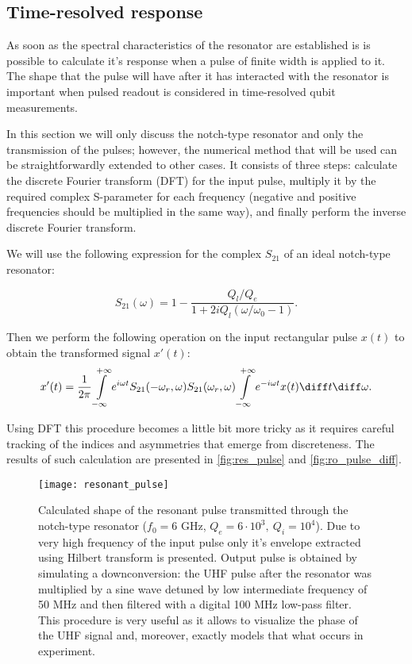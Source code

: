 \subsection{Time-resolved response}

As soon as the spectral characteristics of the resonator are established is is possible to calculate it's response when a pulse of finite width is applied to it. The shape that the pulse will have after it has interacted with the resonator is important when pulsed readout is considered in time-resolved qubit measurements. 

In this section we will only discuss the notch-type resonator and only the transmission of the pulses; however, the numerical method that will be used can be straightforwardly extended to other cases. It consists of three steps: calculate the discrete Fourier transform (DFT) for the input pulse, multiply it by the required complex S-parameter for each frequency (negative and positive frequencies should be multiplied in the same way), and finally perform the inverse discrete Fourier transform. 

We will use the following expression for the complex $S_{21}$ of an ideal notch-type resonator\cite{probst2015}:

\[
S_{21} (\omega)= 1 - \frac{Q_l/Q_e}{1 + 2 i Q_l (\omega/\omega_0 - 1)}.
\]

Then we perform the following operation on the input rectangular pulse $x(t)$ to obtain the transformed signal $x'(t)$:
\[
x'(t) = \frac{1}{2\pi}\int\limits_{-\infty}^{+\infty} e^{i\omega t} {S_{21}(-\omega_r, \omega)}S_{21}(\omega_r, \omega)\int\limits_{-\infty}^{+\infty} e^{-i\omega t}x(t) \diff t \diff \omega.
\]

Using DFT this procedure becomes a little bit more tricky as it requires careful tracking of the indices and asymmetries that emerge from discreteness. The results of such calculation are presented in \autoref{fig:res_pulse} and \autoref{fig:ro_pulse_diff}. 


\begin{figure}
\texttt{[image: resonant\_pulse]}
\caption{Calculated shape of the resonant pulse transmitted through the notch-type resonator ($f_0 = 6$ GHz, $Q_e=6 \cdot 10^3,\ Q_i = 10^4$). Due to very high frequency of the input pulse only it's envelope extracted using Hilbert transform is presented. Output pulse is obtained by simulating a downconversion: the UHF pulse after the resonator was multiplied by a sine wave detuned by low intermediate frequency of 50 MHz and then filtered with a digital 100 MHz low-pass filter. This procedure is very useful as it allows to visualize the phase of the UHF signal and, moreover, exactly models that what occurs in experiment.}
\label{fig:res_pulse}
\end{figure}

